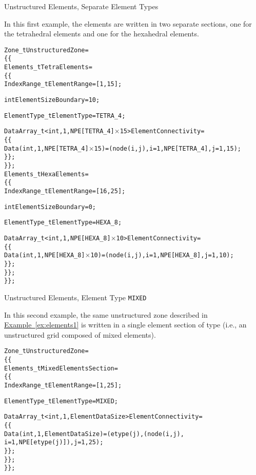 \begin{example}{Unstructured Elements, Separate Element Types}
\label{ex:elements1}

In this first example, the elements are written in two separate sections,
one for the tetrahedral elements and one for the hexahedral elements.
\begin{alltt}
  Zone\_t UnstructuredZone =
    \{\{
    Elements\_t TetraElements =
      \{\{
      IndexRange\_t ElementRange = [1,15] ;

      int ElementSizeBoundary = 10 ;

      ElementType\_t ElementType = TETRA\_4 ;

      DataArray\_t<int, 1, NPE[TETRA\_4]\(\times\)15> ElementConnectivity =
        \{\{
        Data(int, 1, NPE[TETRA\_4]\(\times\)15) = (node(i,j), i=1,NPE[TETRA\_4], j=1,15) ;
        \}\} ;
      \}\} ;
    Elements\_t HexaElements =
      \{\{
      IndexRange\_t ElementRange = [16,25] ;

      int ElementSizeBoundary = 0 ;

      ElementType\_t ElementType = HEXA\_8 ;

      DataArray\_t<int, 1, NPE[HEXA\_8]\(\times\)10> ElementConnectivity =
        \{\{
        Data(int, 1, NPE[HEXA\_8]\(\times\)10) = (node(i,j), i=1,NPE[HEXA\_8], j=1,10) ;
        \}\} ;
      \}\} ;
    \}\} ;
\end{alltt}
\end{example}

\begin{example}{Unstructured Elements, Element Type \texttt{MIXED}}
\label{ex:elements2}

In this second example, the same unstructured zone described in 
\hyperref[ex:elements1]{Example~\ref*{ex:elements1}} is written in a
single element section of type  (i.e., an unstructured grid
composed of mixed elements).
\begin{alltt}
  Zone\_t UnstructuredZone =
    \{\{
    Elements\_t MixedElementsSection =
      \{\{
      IndexRange\_t ElementRange = [1,25] ;

      ElementType\_t ElementType = MIXED ;

      DataArray\_t<int, 1, ElementDataSize> ElementConnectivity =
        \{\{
        Data(int, 1, ElementDataSize) = (etype(j),(node(i,j),
             i=1,NPE[etype(j)]), j=1,25) ;
        \}\} ;
      \}\} ;
    \}\} ;
\end{alltt}
\end{example}

